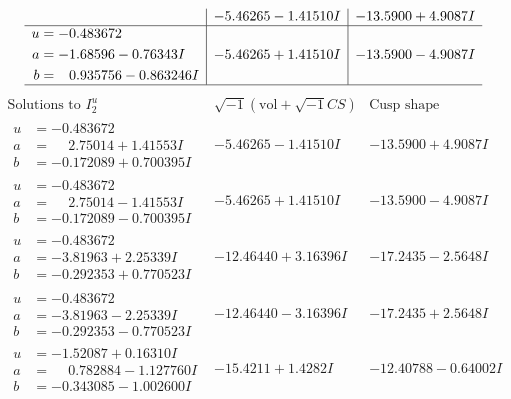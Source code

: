 \documentclass[1p]{elsarticle_modified}
\theoremstyle{definition}
\newcommand{\I}{\sqrt{-1}}
\begin{document}
$$\begin{array}{c|c|c}
 & -5.46265 - 1.41510 I & -13.5900 + 4.9087 I \\ \hline\begin{aligned}
u &= -0.483672\phantom{ +0.000000I} \\
a &= -1.68596 - 0.76343 I \\
b &= \phantom{-}0.935756 - 0.863246 I\end{aligned}
 & -5.46265 + 1.41510 I & -13.5900 - 4.9087 I\\
 \hline 
 \end{array}$$\newpage$$\begin{array}{c|c|c}  
\text{Solutions to }I^u_{2}& \I (\text{vol} + \sqrt{-1}CS) & \text{Cusp shape}\\
 \hline 
\begin{aligned}
u &= -0.483672\phantom{ +0.000000I} \\
a &= \phantom{-}2.75014 + 1.41553 I \\
b &= -0.172089 + 0.700395 I\end{aligned}
 & -5.46265 - 1.41510 I & -13.5900 + 4.9087 I \\ \hline\begin{aligned}
u &= -0.483672\phantom{ +0.000000I} \\
a &= \phantom{-}2.75014 - 1.41553 I \\
b &= -0.172089 - 0.700395 I\end{aligned}
 & -5.46265 + 1.41510 I & -13.5900 - 4.9087 I \\ \hline\begin{aligned}
u &= -0.483672\phantom{ +0.000000I} \\
a &= -3.81963 + 2.25339 I \\
b &= -0.292353 + 0.770523 I\end{aligned}
 & -12.46440 + 3.16396 I & -17.2435 - 2.5648 I \\ \hline\begin{aligned}
u &= -0.483672\phantom{ +0.000000I} \\
a &= -3.81963 - 2.25339 I \\
b &= -0.292353 - 0.770523 I\end{aligned}
 & -12.46440 - 3.16396 I & -17.2435 + 2.5648 I \\ \hline\begin{aligned}
u &= -1.52087 + 0.16310 I \\
a &= \phantom{-}0.782884 - 1.127760 I \\
b &= -0.343085 - 1.002600 I\end{aligned}
 & -15.4211 + 1.4282 I & -12.40788 - 0.64002 I \\ \hline\begin{aligned}

\end{aligned}
\end{array}$$
\end{document}
